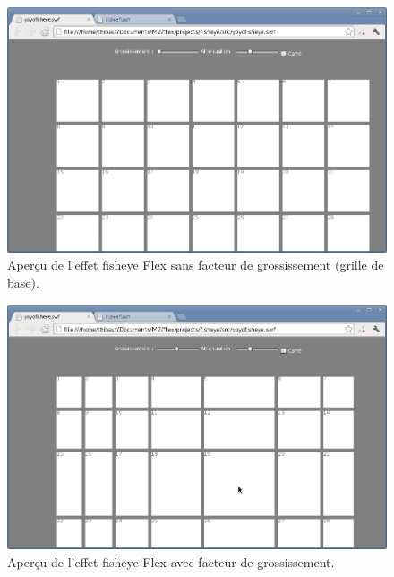 \begin{figure}[H]
  \centering
  \includegraphics[width=\textwidth]{../resources/illustrations/flex_screen_1}
  \caption{Aperçu de l'effet fisheye Flex sans facteur de grossissement (grille de base).}
  \label{fig:js_6}
\end{figure}
\begin{minipage}[H]{.5\textwidth}
\begin{figure}[H]
  \centering
  \includegraphics[width=\textwidth]{../resources/illustrations/flex_screen_2}
  \caption{Aperçu de l'effet fisheye Flex avec facteur de grossissement.}
  \label{fig:js_6}
\end{figure}
\end{minipage}
